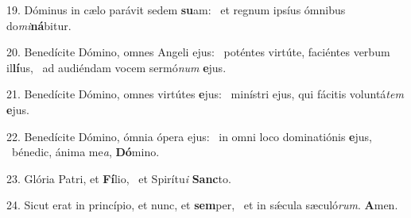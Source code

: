 19. Dóminus in cælo parávit sedem \textbf{su}am: \ast\  et regnum ipsíus ómnibus do\textit{mi}\textbf{ná}bitur.\

20. Benedícite Dómino, omnes Angeli ejus: \dag\  poténtes virtúte, faciéntes verbum il\textbf{lí}us, \ast\  ad audiéndam vocem sermó\textit{num} \textbf{e}jus.\

21. Benedícite Dómino, omnes virtútes \textbf{e}jus: \ast\  minístri ejus, qui fácitis voluntá\textit{tem} \textbf{e}jus.\

22. Benedícite Dómino, ómnia ópera ejus: \dag\  in omni loco dominatiónis \textbf{e}jus, \ast\  bénedic, ánima me\textit{a}, \textbf{Dó}mino.\

23. Glória Patri, et \textbf{Fí}lio, \ast\  et Spirítu\textit{i} \textbf{Sanc}to.\

24. Sicut erat in princípio, et nunc, et \textbf{sem}per, \ast\  et in sǽcula sæculó\textit{rum}. \textbf{A}men.\

